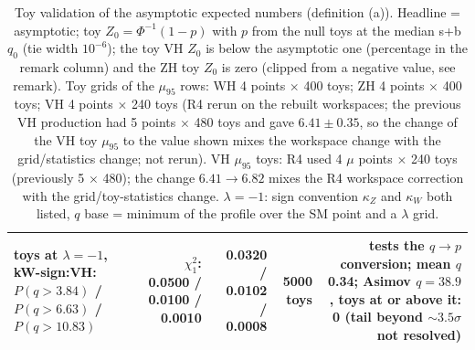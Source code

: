 \begin{table}[ht]
\begin{tabular}{lrrrr}
toys at $\lambda{=}{-}1$, kW-sign:VH: $P(q>3.84)$ / $P(q>6.63)$ / $P(q>10.83)$ & $\chi^2_1$: 0.0500 / 0.0100 / 0.0010 & 0.0320 / 0.0102 / 0.0008 & 5000 toys & tests the $q\to p$ conversion; mean $q$ 0.34; Asimov $q=38.9$, toys at or above it: 0 (tail beyond $\sim3.5\sigma$ not resolved) \\\hline
\end{tabular}
\caption{Toy validation of the asymptotic expected numbers (definition (a)). Headline = asymptotic; toy $Z_0=\Phi^{-1}(1-p)$ with $p$ from the null toys at the median s+b $q_0$ (tie width $10^{-6}$); the toy VH $Z_0$ is below the asymptotic one (percentage in the remark column) and the ZH toy $Z_0$ is zero (clipped from a negative value, see remark). Toy grids of the $\mu_{95}$ rows: WH 4 points $\times$ 400 toys; ZH 4 points $\times$ 400 toys; VH 4 points $\times$ 240 toys (R4 rerun on the rebuilt workspaces; the previous VH production had 5 points $\times$ 480 toys and gave $6.41\pm0.35$, so the change of the VH toy $\mu_{95}$ to the value shown mixes the workspace change with the grid/statistics change; not rerun). VH $\mu_{95}$ toys: R4 used 4 $\mu$ points $\times$ 240 toys (previously 5 $\times$ 480); the change $6.41\to6.82$ mixes the R4 workspace correction with the grid/toy-statistics change. $\lambda=-1$: sign convention $\kappa_Z$ and $\kappa_W$ both listed, $q$ base = minimum of the profile over the SM point and a $\lambda$ grid.}
\end{table}
